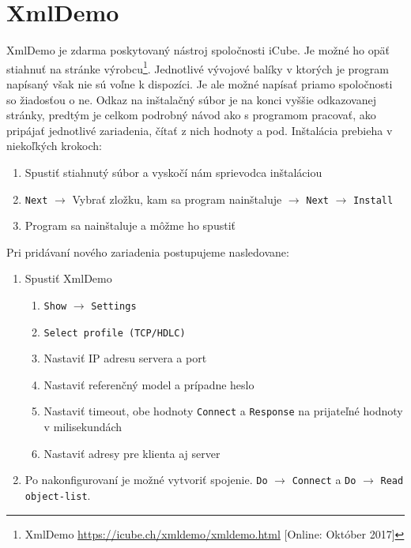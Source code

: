 \section{XmlDemo}
\label{Ako_XML}
\tab XmlDemo je zdarma poskytovaný nástroj spoločnosti iCube. Je možné ho opäť stiahnuť na stránke výrobcu\footnote{XmlDemo \url{https://icube.ch/xmldemo/xmldemo.html} [Online: Október 2017]}. Jednotlivé vývojové balíky v ktorých je program napísaný však nie sú voľne k dispozíci. Je ale možné napísať priamo spoločnosti so žiadosťou o ne. Odkaz na inštalačný súbor je na konci vyššie odkazovanej stránky, predtým je celkom podrobný návod ako s programom pracovať, ako pripájať jednotlivé zariadenia, čítať z nich hodnoty a pod. 
Inštalácia prebieha v niekoľkých krokoch:
\begin{enumerate}
\item Spustiť stiahnutý súbor a vyskočí nám sprievodca inštaláciou
\item {\tt Next} $\rightarrow$ Vybrať zložku, kam sa program nainštaluje $\rightarrow$ {\tt Next} $\rightarrow$ {\tt Install}
\item Program sa nainštaluje a môžme ho spustiť
\end{enumerate} \par
Pri pridávaní nového zariadenia postupujeme nasledovane:
\begin{enumerate}
\item Spustiť XmlDemo
\begin{enumerate}
\item {\tt Show} $\rightarrow$ {\tt Settings}
\item {\tt Select profile (TCP/HDLC)}
\item Nastaviť IP adresu servera a port
\item Nastaviť referenčný model a prípadne heslo
\item Nastaviť timeout, obe hodnoty {\tt Connect} a {\tt Response} na prijateľné hodnoty v milisekundách
\item Nastaviť adresy pre klienta aj server
\end{enumerate}
\item Po nakonfigurovaní je možné vytvoriť spojenie. {\tt Do} $\rightarrow$ {\tt Connect} a {\tt Do} $\rightarrow$ {\tt Read object-list}.
\end{enumerate} \par

